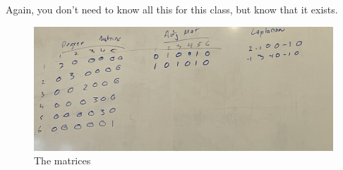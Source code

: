 \documentclass{article}
\begin{document}
Again, you don't need to know all this for this class, but know that it exists. 

\begin{figure}[htp]
    \centering
    \includegraphics[width=0.75\linewidth]{Screen Shot 2023-11-29 at 11.45.06 AM.png}
    \caption{The matrices}
    \label{fig:enter-label}
\end{figure}
\end{document}
